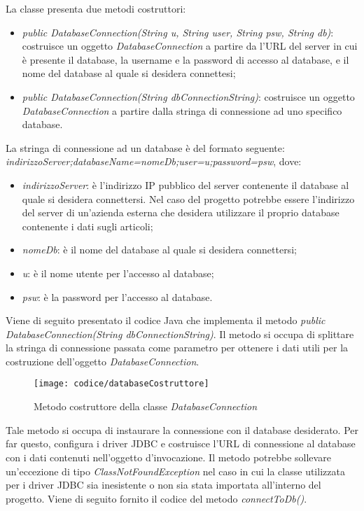 La classe presenta due metodi costruttori:
\begin{itemize}
	\item \textit{public DatabaseConnection(String u, String user, String psw, String db)}: costruisce un oggetto \textit{DatabaseConnection} a partire  da l'URL del server in cui è presente il database, la username e la password di accesso al database, e il nome del database al quale si desidera connettesi;
	\item \textit{public DatabaseConnection(String dbConnectionString)}: costruisce un oggetto \textit{DatabaseConnection} a partire dalla stringa di connessione ad uno specifico database.
\end{itemize}
La stringa di connessione ad un database è del formato seguente: \textit{indirizzoServer;databaseName=nomeDb;user=u;password=psw}, dove:
\begin{itemize}
	\item \textit{indirizzoServer}: è l'indirizzo IP pubblico del server contenente il database al quale si desidera connettersi. Nel caso del progetto potrebbe essere l'indirizzo del server di un'azienda esterna che desidera utilizzare il proprio database contenente i dati sugli articoli;
	\item \textit{nomeDb}: è il nome del database al quale si desidera connettersi;
	\item \textit{u}: è il nome utente per l'accesso al database;
	\item \textit{psw}: è la password per l'accesso al database.
\end{itemize}
Viene di seguito presentato il codice Java che implementa il metodo \textit{public DatabaseConnection(String dbConnectionString)}. Il metodo si occupa di splittare la stringa di connessione passata come parametro per ottenere i dati utili per la costruzione dell'oggetto \textit{DatabaseConnection}.

\begin{figure}[!h] 
    \centering 
    \texttt{[image: codice/databaseCostruttore]} 
    \caption{Metodo costruttore della classe \textit{DatabaseConnection}}
\end{figure}


Tale metodo si occupa di instaurare la connessione con il database desiderato. Per far questo, configura i driver JDBC e costruisce l'URL di connessione al database con i dati contenuti nell'oggetto d'invocazione. Il metodo potrebbe sollevare un'eccezione di tipo \textit{ClassNotFoundException} nel caso in cui la classe utilizzata per i driver JDBC sia inesistente o non sia stata importata all'interno del progetto. Viene di seguito fornito il codice del metodo \textit{connectToDb()}.

